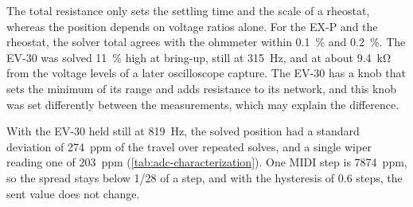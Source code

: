 The total resistance only sets the settling time and the scale of a rheostat, whereas the position depends on voltage ratios alone. For the EX-P and the rheostat, the solver total agrees with the ohmmeter within \qty{0.1}{\percent} and \qty{0.2}{\percent}. The EV-30 was solved \qty{11}{\percent} high at bring-up, still at \qty{315}{\hertz}, and at about \qty{9.4}{\kilo\ohm} from the voltage levels of a later oscilloscope capture. The EV-30 has a knob that sets the minimum of its range and adds resistance to its network, and this knob was set differently between the measurements, which may explain the difference.

With the EV-30 held still at \qty{819}{\hertz}, the solved position had a standard deviation of \num{274}~ppm of the travel over repeated solves, and a single wiper reading one of \num{203}~ppm (\cref{tab:adc-characterization}). One MIDI step is \num{7874}~ppm, so the spread stays below 1/28 of a step, and with the hysteresis of 0.6 steps, the sent value does not change.
